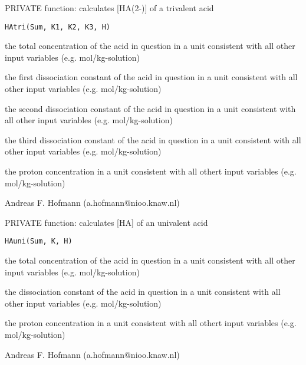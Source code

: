 \documentclass{article}
\begin{document}
\begin{Description}\relax
PRIVATE function: calculates [HA(2-)] of a trivalent acid
\end{Description}
\begin{Usage}
\begin{verbatim}HAtri(Sum, K1, K2, K3, H)\end{verbatim}
\end{Usage}
\begin{Arguments}
\begin{ldescription}
\item[\code{Sum }] the total concentration of the acid in question in a unit consistent with all other input variables (e.g. mol/kg-solution)
\item[\code{K1 }] the first dissociation constant of the acid in question in a unit consistent with all other input variables (e.g. mol/kg-solution)
\item[\code{K2 }] the second dissociation constant of the acid in question in a unit consistent with all other input variables (e.g. mol/kg-solution)
\item[\code{K3 }] the third dissociation constant of the acid in question in a unit consistent with all other input variables (e.g. mol/kg-solution)
\item[\code{H }] the proton concentration in a unit consistent with all othert input variables (e.g. mol/kg-solution)
\end{ldescription}
\end{Arguments}
\begin{Author}\relax
Andreas F. Hofmann (a.hofmann@nioo.knaw.nl)
\end{Author}

\begin{Description}\relax
PRIVATE function: calculates [HA] of an univalent acid
\end{Description}
\begin{Usage}
\begin{verbatim}HAuni(Sum, K, H)\end{verbatim}
\end{Usage}
\begin{Arguments}
\begin{ldescription}
\item[\code{Sum }] the total concentration of the acid in question in a unit consistent with all other input variables (e.g. mol/kg-solution)
\item[\code{K }] the dissociation constant of the acid in question in a unit consistent with all other input variables (e.g. mol/kg-solution)
\item[\code{H }] the proton concentration in a unit consistent with all othert input variables (e.g. mol/kg-solution)
\end{ldescription}
\end{Arguments}
\begin{Author}\relax
Andreas F. Hofmann (a.hofmann@nioo.knaw.nl)
\end{Author}
\end{document}
